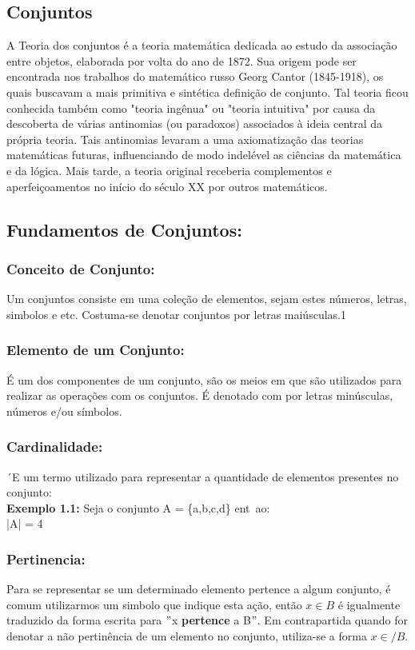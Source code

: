 \documentclass[a4paper,12pt,twoside,BCOR=10mm]{scrbook}
\begin{document}
\begin{titlepage}
\vfill \vspace*{1cm}

\tableofcontents

\chapter{Conjuntos}
\setcounter{page}{1}
A Teoria dos conjuntos  é a teoria matemática dedicada ao estudo da associação entre objetos, elaborada por volta do ano de 1872. Sua origem pode ser encontrada nos trabalhos do matemático russo Georg Cantor (1845-1918), os quais buscavam a mais primitiva e sintética definição de conjunto. Tal teoria ficou conhecida também como "teoria ingênua" ou "teoria intuitiva" por causa da descoberta de várias antinomias (ou paradoxos) associados à ideia central da própria teoria. Tais antinomias levaram a uma axiomatização das teorias matemáticas futuras, influenciando de modo indelével as ciências da matemática e da lógica. Mais tarde, a teoria original receberia complementos e aperfeiçoamentos no início do século XX por outros matemáticos.
\section{Fundamentos de Conjuntos:}
\subsection{Conceito de Conjunto:}
Um conjuntos consiste em uma coleção de elementos, sejam estes números, letras, simbolos e etc. Costuma-se denotar conjuntos por letras maiúsculas.1

\subsection{Elemento de um Conjunto:}
É um dos componentes de um conjunto, são os meios em que são utilizados para realizar as operações com os conjuntos. É denotado com por letras minúsculas, números e/ou símbolos.

\subsection{Cardinalidade:}
´E um termo utilizado para representar a quantidade de elementos presentes no conjunto:\\
\textbf{Exemplo 1.1:} Seja o conjunto A = \{a,b,c,d\} ent~ao:\\
|A| = 4

\subsection{Pertinencia:}
Para se representar se um determinado elemento pertence a algum conjunto, é comum utilizarmos um simbolo que indique esta ação, então $x \in B$ é igualmente traduzido da forma escrita para $"$x \textbf{pertence} a B$"$.
Em contrapartida quando for denotar a não pertinência de um elemento no conjunto, utiliza-se a forma $x \in\!\!\!\!\!\!\!/  B$. 


\end{titlepage}
\end{document}
